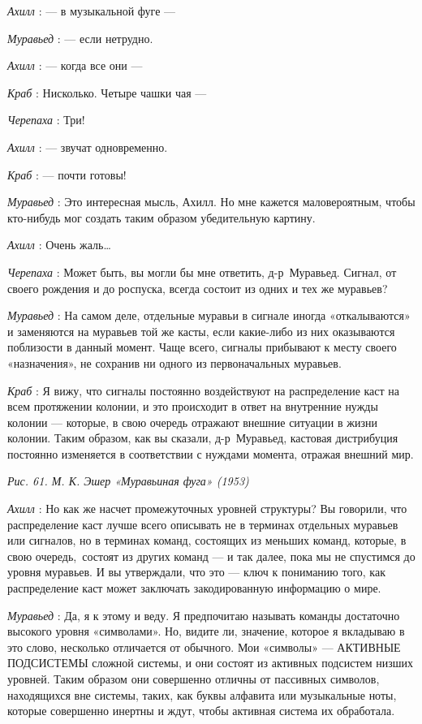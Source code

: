 \documentclass[../main.tex]{subfiles}
\begin{document}
\begin{dialogue}
\emph{Ахилл} : --- в музыкальной фуге ---

\emph{Муравьед} : --- если нетрудно.

\emph{Ахилл} : --- когда все они ---

\emph{Краб} : Нисколько. Четыре чашки чая ---

\emph{Черепаха} : Три!

\emph{Ахилл} : --- звучат одновременно.

\emph{Краб} : --- почти готовы!

\emph{Муравьед} : Это интересная мысль, Ахилл. Но мне кажется маловероятным, чтобы кто-нибудь мог создать таким образом убедительную картину.

\emph{Ахилл} : Очень жаль\ldots{}

\emph{Черепаха} : Может быть, вы могли бы мне ответить, д-р~Муравьед. Сигнал, от своего рождения и до роспуска, всегда состоит из одних и тех же муравьев?

\emph{Муравьед} : На самом деле, отдельные муравьи в сигнале иногда «откалываются» и заменяются на муравьев той же касты, если какие-либо из них оказываются поблизости в данный момент. Чаще всего, сигналы прибывают к месту своего «назначения», не сохранив ни одного из первоначальных муравьев.

\emph{Краб} : Я вижу, что сигналы постоянно воздействуют на распределение каст на всем протяжении колонии, и это происходит в ответ на внутренние нужды колонии --- которые, в свою очередь отражают внешние ситуации в жизни колонии. Таким образом, как вы сказали, д-р~Муравьед, кастовая дистрибуция постоянно изменяется в соответствии с нуждами момента, отражая внешний мир.

\emph{Рис. 61. М. К. Эшер «Муравьиная фуга» (1953)}

\emph{Ахилл} : Но как же насчет промежуточных уровней структуры? Вы говорили, что распределение каст лучше всего описывать не в терминах отдельных муравьев или сигналов, но в терминах команд, состоящих из меньших команд, которые, в свою очередь,~состоят из других команд --- и так далее, пока мы не спустимся до уровня муравьев. И вы утверждали, что это --- ключ к пониманию того, как распределение каст может заключать закодированную информацию о мире.

\emph{Муравьед} : Да, я к этому и веду. Я предпочитаю называть команды достаточно высокого уровня «символами». Но, видите ли, значение, которое я вкладываю в это слово, несколько отличается от обычного. Мои «символы» --- АКТИВНЫЕ ПОДСИСТЕМЫ сложной системы, и они состоят из активных подсистем низших уровней. Таким образом они совершенно отличны от пассивных символов, находящихся вне системы, таких, как буквы алфавита или музыкальные ноты, которые совершенно инертны и ждут, чтобы активная система их обработала.~


\end{dialogue}
\end{document}
